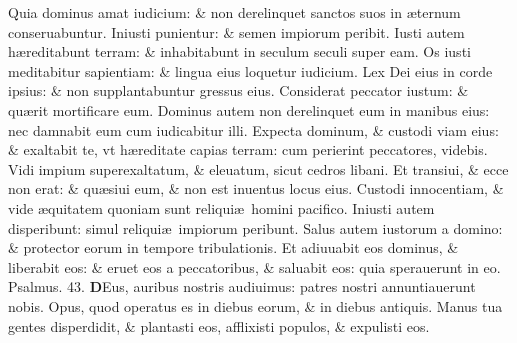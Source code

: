 \documentclass[a5paper,10pt]{book}
\def\ae{æ}
\begin{document}
\begin{multicols*}{2}
\newline \color{red} Q\color{black}uia dominus amat iudicium: \& non derelinquet sanctos suos in \ae ternum conseruabuntur.
\newline \color{red} I\color{black}niusti punientur: \& semen impiorum peribit.
\newline \color{red} I\color{black}usti autem h\ae reditabunt terram: \& inhabitabunt in seculum seculi super eam.
\newline \color{red} O\color{black}s iusti meditabitur sapientiam: \& lingua eius loquetur iudicium.
\newline \color{red} L\color{black}ex Dei eius in corde ipsius: \& non supplantabuntur gressus eius.
\newline \color{red} C\color{black}onsiderat peccator iustum: \& qu\ae rit mortificare eum.
\newline \color{red} D\color{black}ominus autem non derelinquet eum in manibus eius: nec damnabit eum cum iudicabitur illi.
\newline \color{red} E\color{black}xpecta dominum, \& custodi viam eius: \& exaltabit te, vt h\ae reditate capias terram: cum perierint peccatores, videbis.
\newline \color{red} V\color{black}idi impium superexaltatum, \& eleuatum, sicut cedros libani.
\newline \color{red} E\color{black}t transiui, \& ecce non erat: \& qu\ae siui eum, \& non est inuentus locus eius.
\newline \color{red} C\color{black}ustodi innocentiam, \& vide \ae quitatem quoniam sunt reliqui\ae \ homini pacifico.
\newline \color{red} I\color{black}niusti autem disperibunt: simul reliqui\ae \ impiorum peribunt.%
\newline \color{red} S\color{black}alus autem iustorum a domino: \& protector eorum in tempore tribulationis.
\newline \color{red} E\color{black}t adiuuabit eos dominus, \& liberabit eos: \& eruet eos a peccatoribus, \& saluabit eos: quia sperauerunt in eo.
\newline \color{red} Psalmus. \hypertarget{ps43}{43.} \color{black}
\vspace{-1em}
\lettrine[lines=2]{\bfseries \color{red} D}{}Eus, auribus nostris audiuimus: patres nostri annuntiauerunt nobis.
\newline \color{red} O\color{black}pus, quod operatus es in diebus eorum, \& in diebus antiquis.
\newline \color{red} M\color{black}anus tua gentes disperdidit, \& plantasti eos, afflixisti populos, \& expulisti eos.

\end{multicols*}
\end{document}
